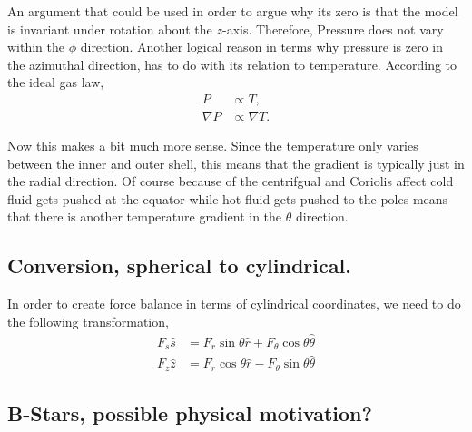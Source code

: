 An argument that could be used in order to argue why its zero is that the model is invariant under rotation about the $z$-axis. Therefore, Pressure does not vary within the $\phi$ direction. Another logical reason in terms why pressure is zero in the azimuthal direction, has to do with its relation to temperature. According to the ideal gas law, 
\begin{align}
	P &\propto T, \\
	\nabla P &\propto \nabla T.
\end{align} 

Now this makes a bit much more sense. Since the temperature only varies between the inner and outer shell, this means that the gradient is typically just in the radial direction. Of course because of the centrifgual and Coriolis affect cold fluid gets pushed at the equator while hot fluid gets pushed to the poles means that there is another temperature gradient in the $\theta$ direction.  


\subsection{Conversion, spherical to cylindrical.}
In order to create force balance in terms of cylindrical coordinates, we need to do the following transformation, 
\begin{align}
	F_s \hat{s} &= F_r \sin{\theta} \hat{r} + F_{\theta} \cos{\theta} \hat{\theta} \\
	F_z \hat{z} &= F_r \cos{\theta} \hat{r} - F_{\theta} \sin{\theta} \hat{\theta}
\end{align}


\subsection{B-Stars, possible physical motivation?}
